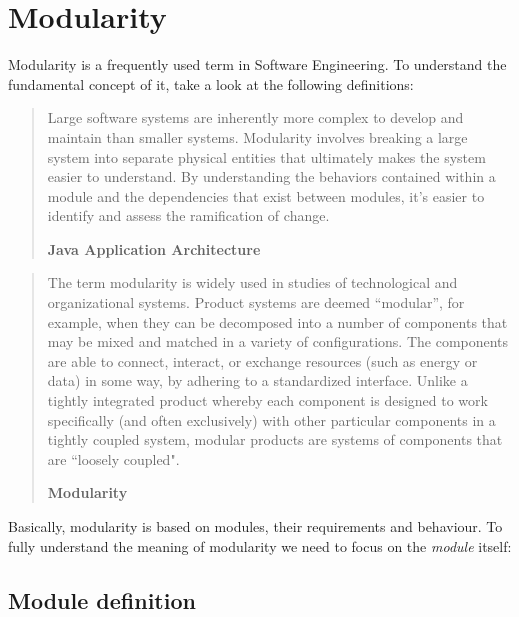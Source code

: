 \section{Modularity}
\label{sec:modularity}

Modularity is a frequently used term in Software Engineering. To understand the fundamental concept of it, take a look at the following definitions:

\begin{quote}
Large software systems are inherently more complex to develop and maintain than smaller systems. Modularity involves breaking a large system into separate physical entities that ultimately makes the system easier to understand. By understanding the behaviors contained within a module and the dependencies that exist between modules, it’s easier to identify and assess the ramification of change.

\hfill \textbf{Java Application Architecture}

\hfill \citeauthor{Knoernschild:2012} \cite{Knoernschild:2012}
\end{quote}

\begin{quote}
The term modularity is widely used in studies of technological and organizational systems. Product systems are deemed “modular”, for example, when they can be decomposed into a number of components that may be mixed and matched in a variety of configurations. The components are able to connect, interact, or exchange resources (such as energy or data) in some way, by adhering to a standardized interface. Unlike a tightly integrated product whereby each component is designed to work specifically (and often exclusively) with other particular components in a tightly coupled system, modular products are systems of components that are “loosely coupled".

\hfill \textbf{Modularity}

\hfill \citeauthor{Wikipedia:Modularity:2012} \cite{Wikipedia:Modularity:2012}
\end{quote}

Basically, modularity is based on modules, their requirements and behaviour. To fully understand the meaning of modularity we need to focus on the \textit{module} itself:

\newpage
\subsection{Module definition}
\label{sec:module}

